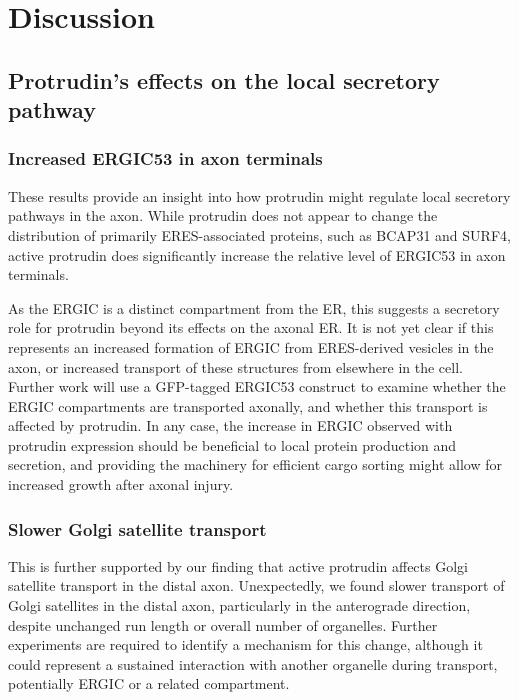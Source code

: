 \documentclass[
  12pt,
  a4paper,
]{book}
\begin{document}
\hypertarget{discussion-1}{%
\section{Discussion}\label{discussion-1}}

\hypertarget{protrudins-effects-on-the-local-secretory-pathway}{%
\subsection{Protrudin's effects on the local secretory pathway}\label{protrudins-effects-on-the-local-secretory-pathway}}

\hypertarget{increased-ergic53-in-axon-terminals}{%
\subsubsection{Increased ERGIC53 in axon terminals}\label{increased-ergic53-in-axon-terminals}}

These results provide an insight into how protrudin might regulate local secretory pathways in the axon. While protrudin does not appear to change the distribution of primarily ERES-associated proteins, such as BCAP31 and SURF4, active protrudin does significantly increase the relative level of ERGIC53 in axon terminals.

As the ERGIC is a distinct compartment from the ER, this suggests a secretory role for protrudin beyond its effects on the axonal ER. It is not yet clear if this represents an increased formation of ERGIC from ERES-derived vesicles in the axon, or increased transport of these structures from elsewhere in the cell. Further work will use a GFP-tagged ERGIC53 construct to examine whether the ERGIC compartments are transported axonally, and whether this transport is affected by protrudin. In any case, the increase in ERGIC observed with protrudin expression should be beneficial to local protein production and secretion, and providing the machinery for efficient cargo sorting might allow for increased growth after axonal injury.

\hypertarget{GS-discussion}{%
\subsubsection{Slower Golgi satellite transport}\label{GS-discussion}}

This is further supported by our finding that active protrudin affects Golgi satellite transport in the distal axon. Unexpectedly, we found slower transport of Golgi satellites in the distal axon, particularly in the anterograde direction, despite unchanged run length or overall number of organelles. Further experiments are required to identify a mechanism for this change, although it could represent a sustained interaction with another organelle during transport, potentially ERGIC or a related compartment.
\end{document}
